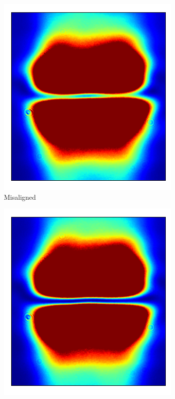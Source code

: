 \begin{figure}
    \begin{subfigure}{0.3\textwidth}
        \includegraphics[width=\textwidth]{chapters/chapter_3/figures/align1.pdf}
        \caption{Misaligned}
    \end{subfigure}
    \hfill
    \begin{subfigure}{0.3\textwidth}
        \includegraphics[width=\textwidth]{chapters/chapter_3/figures/align3.pdf}

\end{subfigure}
\end{figure}
